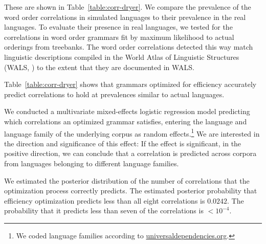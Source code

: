 \documentclass[9pt,twocolumn,twoside,lineno]{pnas-new}
\begin{document}
These are shown in Table~\ref{table:corr-dryer}.
We compare the prevalence of the word order correlations in simulated languages to their prevalence in the real languages.
To evaluate their presence in real languages, we tested for the correlations in word order grammars fit by maximum likelihood to actual orderings from treebanks.
The word order correlations detected this way match linguistic descriptions compiled in the World Atlas of Linguistic Structures (WALS, \cite{wals}) to the extent that they are documented in WALS. %


Table~\ref{table:corr-dryer} shows that grammars optimized for efficiency accurately predict correlations to hold at prevalences similar to actual languages.

We conducted a multivariate mixed-effects logistic regression model predicting which correlations an optimized grammar satisfies, entering the language and language family of the underlying corpus as random effects.\footnote{We coded language families according to \url{universaldependencies.org}.}
We are interested in the direction and significance of this effect: 
If the effect is significant, in the positive direction, we can conclude that a correlation is predicted across corpora from languages belonging to different language families.

We estimated the posterior distribution of the number of correlations that the optimization process correctly predicts.
The estimated posterior probability that efficiency optimization predicts less than all eight correlations is $0.0242$. The probability that it predicts less than seven of the correlations is $<10^{-4}$.
\end{document}
